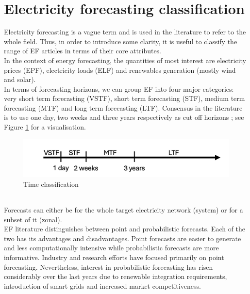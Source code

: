 \section{Electricity forecasting classification}
Electricity forecasting is a vague term and is used in the literature to refer to the whole field. Thus, in order to introduce some clarity, it is useful to classify the range of EF articles in terms of their core attributes.
\\
In the context of energy forecasting, the quantities of most interest are electricity prices (EPF), electricity loads (ELF) and renewables generation (mostly wind and solar).
\\
In terms of forecasting horizons, we can group EF into four major categories: very short term forecasting (VSTF), short term forecasting (STF), medium term forecasting (MTF) and long term forecasting (LTF). Consensus in the literature is to use one day, two weeks and three years respectively as cut off horizons \cite{hong_phd}; see Figure \ref{fig:time} for a visualisation. 
\begin{figure}
  \includegraphics[width=\textwidth]{images/time_2.png}
  \caption{Time classification \cite{prob_elf}}
  \label{fig:time}
\end{figure}
\\
Forecasts can either be for the whole target electricity network (system) or for a subset of it (zonal).
\\
EF literature distinguishes between point and probabilistic forecasts. Each of the two has its advantages and disadvantages. Point forecasts are easier to generate and less computationally intensive while probabilistic forecasts are more informative. Industry and research efforts have focused primarily on point forecasting. Nevertheless, interest in probabilistic forecasting has risen considerably over the last years due to renewable integration requirements, introduction of smart grids and increased market competitiveness.
